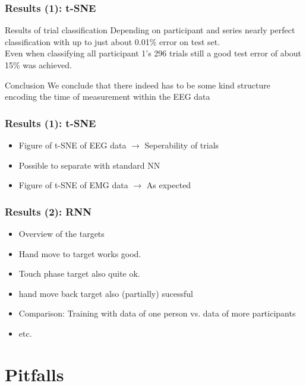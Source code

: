 \documentclass{beamer}
\begin{document}
\begin{frame}
	\frametitle{Results (1): t-SNE}
	
	\begin{block}{Results of trial classification}
		Depending on participant and series nearly perfect classification with up to just about 0.01\% error on test set.\\
		Even when classifying all participant 1's 296 trials still a good test error of about 15\% was achieved.
	\end{block}
	
	\begin{block}{Conclusion}
		We conclude that there indeed has to be some kind structure encoding the time of measurement within the EEG data 
	\end{block}
\end{frame}

		
		
		
\begin{frame}
	\frametitle{Results (1): t-SNE}
	\begin{itemize}
		\item Figure of t-SNE of EEG data $\rightarrow$ Seperability of trials
		\item Possible to separate with standard NN
		\item Figure of t-SNE of EMG data $\rightarrow$ As expected
	\end{itemize}
\end{frame}

\begin{frame}
	\frametitle{Results (2): RNN}
	\begin{itemize}
		\item Overview of the targets
		\item Hand move to target works good.
		\item Touch phase target also quite ok.
		\item hand move back target also (partially) sucessful
		\item Comparison: Training with data of one person vs. data of more participants
		\item etc.
	\end{itemize}
\end{frame}

\section{Pitfalls}
\end{document}
